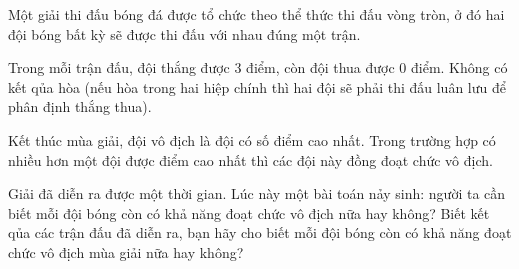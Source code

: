 Một giải thi đấu bóng đá được tổ chức theo thể thức thi đấu vòng tròn, ở đó hai đội bóng bất kỳ sẽ được thi đấu với nhau đúng một trận.  

   Trong mỗi trận đấu, đội thắng được 3 điểm, còn đội thua được 0 điểm. Không có kết qủa hòa (nếu hòa trong hai hiệp chính thì hai đội sẽ phải thi đấu luân lưu để phân định thắng thua).  

   Kết thúc mùa giải, đội vô địch là đội có số điểm cao nhất. Trong trường hợp có nhiều hơn một đội được điểm cao nhất thì các đội này đồng đoạt chức vô địch.  

   Giải đã diễn ra được một thời gian. Lúc này một bài toán nảy sinh: người ta cần biết mỗi đội bóng còn có khả năng đoạt chức vô địch nữa hay không?
Biết kết qủa các trận đấu đã diễn ra, bạn hãy cho biết mỗi đội bóng còn có khả năng đoạt chức vô địch mùa giải nữa hay không?